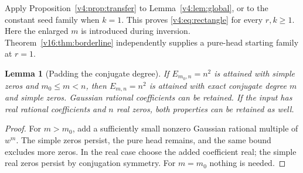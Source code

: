 \documentclass[UTF8,11pt]{ctexart}
\newtheorem{lem}[thm]{Lemma}
\theoremstyle{definition}
\numberwithin{equation}{section}
\begin{document}
Apply Proposition~\ref{v4:prop:transfer} to
Lemma~\ref{v4:lem:global}, or to the constant seed family when
$k=1$. This proves \eqref{v4:eq:rectangle} for every $r,k\ge1$.
Here the enlarged $m$ is introduced during inversion.
Theorem~\ref{v16:thm:borderline} independently supplies a pure-head
starting family at $r=1$.

\begin{lem}[Padding the conjugate degree]\label{v3:lem:padding}
If $E_{m_0,n}=n^2$ is attained with simple zeros and $m_0\le m<n$,
then $E_{m,n}=n^2$ is attained with exact conjugate degree $m$ and
simple zeros. Gaussian rational coefficients can be retained. If the
input has real rational coefficients and $n$ real zeros, both properties
can be retained as well.
\end{lem}
\begin{proof}
For $m>m_0$, add a sufficiently small nonzero Gaussian rational
multiple of $w^m$. The simple zeros persist, the pure head remains,
and the same bound excludes more zeros. In the real case choose the
added coefficient real; the simple real zeros persist by conjugation
symmetry. For $m=m_0$ nothing is needed.
\end{proof}
\end{document}
